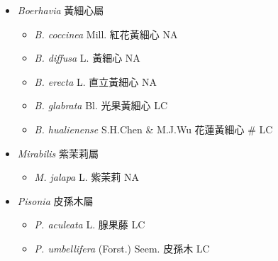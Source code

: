
  \begin{itemize}
 \item[] \textit{Boerhavia} 黃細心屬
                                
  \begin{itemize}
        \item[] \textit{B. coccinea} Mill.  紅花黃細心   NA
        \item[] \textit{B. diffusa} L.  黃細心   NA
        \item[] \textit{B. erecta} L.  直立黃細心   NA
        \item[] \textit{B. glabrata} Bl.  光果黃細心   LC
        \item[] \textit{B. hualienense} S.H.Chen \& M.J.Wu  花蓮黃細心  \# LC
  \end{itemize}
 \item[] \textit{Mirabilis} 紫茉莉屬
                                
  \begin{itemize}
        \item[] \textit{M. jalapa} L.  紫茉莉   NA
  \end{itemize}
 \item[] \textit{Pisonia} 皮孫木屬
                                
  \begin{itemize}
        \item[] \textit{P. aculeata} L.  腺果藤   LC
        \item[] \textit{P. umbellifera} (Forst.) Seem.  皮孫木   LC
  \end{itemize}
  \end{itemize}
